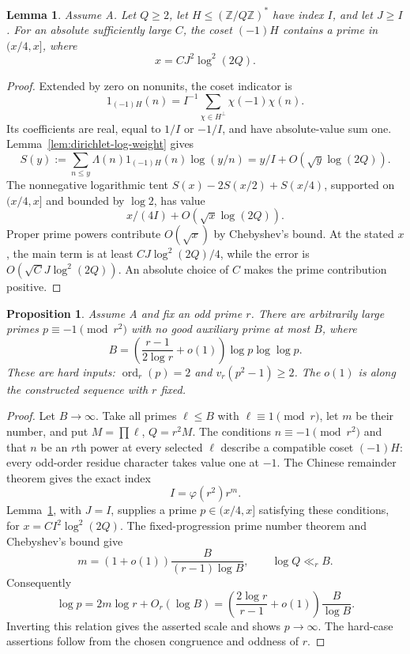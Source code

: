 \documentclass[11pt]{article}
\newtheorem{proposition}[theorem]{Proposition}
\newtheorem{lemma}[theorem]{Lemma}
\theoremstyle{definition}
\theoremstyle{remark}
\begin{document}
\begin{lemma}\label{lem:compatible-bad-coset}
Assume A.  Let $Q\ge2$, let $H\le(\mathbb Z/Q\mathbb Z)^*$
have index $I$, and let $J\ge I$.  For an absolute sufficiently
large $C$, the coset $(-1)H$ contains a prime in $(x/4,x]$, where
\[
 x=CJ^2\log^2(2Q).
\]
\end{lemma}

\begin{proof}
Extended by zero on nonunits, the coset indicator is
\[
 1_{(-1)H}(n)=I^{-1}\sum_{\chi\in H^\perp}\chi(-1)\chi(n).
\]
Its coefficients are real, equal to $1/I$ or $-1/I$, and have
absolute-value sum one.  Lemma~\ref{lem:dirichlet-log-weight} gives
\[
 S(y):=\sum_{n\le y}\Lambda(n)1_{(-1)H}(n)\log(y/n)
       =y/I+O(\sqrt y\log(2Q)).
\]
The nonnegative logarithmic tent
$S(x)-2S(x/2)+S(x/4)$, supported on $(x/4,x]$ and bounded
by $\log2$, has value
\[
 x/(4I)+O(\sqrt x\log(2Q)).
\]
Proper prime powers contribute $O(\sqrt x)$ by Chebyshev's bound.
At the stated $x$, the main term is at least
$CJ\log^2(2Q)/4$, while the error is
$O(\sqrt C J\log^2(2Q))$.  An absolute choice of $C$ makes
the prime contribution positive.
\end{proof}

\begin{proposition}\label{prop:auxiliary-lower-comparison}
Assume A and fix an odd prime $r$.  There are arbitrarily large
primes $p\equiv-1\pmod{r^2}$ with no good auxiliary prime at
most $B$, where
\[
 B=\left(\frac{r-1}{2\log r}+o(1)\right)
                   \log p\log\log p.
\]
These are hard inputs: $\operatorname{ord}_r(p)=2$ and
$v_r(p^2-1)\ge2$.  The $o(1)$ is along the constructed sequence
with $r$ fixed.
\end{proposition}

\begin{proof}
Let $B\to\infty$.  Take all primes $\ell\le B$ with
$\ell\equiv1\pmod r$, let $m$ be their number, and put
$M=\prod\ell$, $Q=r^2M$.  The conditions
$n\equiv-1\pmod{r^2}$ and that $n$ be an $r$th power at
every selected $\ell$ describe a compatible coset $(-1)H$:
every odd-order residue character takes value one at $-1$.
The Chinese remainder theorem gives the exact index
\[
 I=\varphi(r^2)r^m.
\]
Lemma~\ref{lem:compatible-bad-coset}, with $J=I$, supplies a
prime $p\in(x/4,x]$ satisfying these conditions, for
$x=CI^2\log^2(2Q)$.  The fixed-progression prime number theorem
and Chebyshev's bound give
\[
 m=(1+o(1))\frac B{(r-1)\log B},\qquad \log Q\ll_r B.
\]
Consequently
\[
 \log p=2m\log r+O_r(\log B)
   =\left(\frac{2\log r}{r-1}+o(1)\right)\frac B{\log B}.
\]
Inverting this relation gives the asserted scale and shows
$p\to\infty$.  The hard-case assertions follow from the chosen
congruence and oddness of $r$.
\end{proof}
\end{document}
